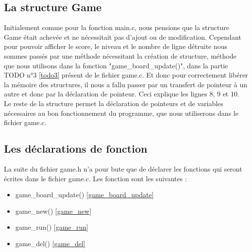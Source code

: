 \documentclass[a4paper,10p]{report}
\begin{document}
\subsection{La structure Game}
Initialement comme pour la fonction main.c, nous pensions que la structure Game était achevée et ne nécessitait pas d'ajout ou de modification. Cependant pour pouvoir afficher le score, le niveau et le nombre de ligne détruite nous sommes passés par une méthode nécessitant la création de structure, méthode que nous utilisons dans la fonction "game\_board\_update()", dans la partie TODO n°3 \ref{todo3} présent de le fichier game.c. Et donc pour correctement libérer la mémoire des structures, il nous a fallu passer par un transfert de pointeur à un autre et donc par la déclaration de pointeur. Ceci explique les lignes \textcolor{gris}{8}, \textcolor{gris}{9} et \textcolor{gris}{10}. Le reste de la structure permet la déclaration de pointeurs et de variables nécessaires au bon fonctionnement du programme, que nous utiliserons dans le fichier game.c.

\subsection{Les déclarations de fonction}
La suite du fichier game.h n'a pour bute que de déclarer les fonctions qui seront écrites dans le fichier game.c. Les fonction sont les suivantes :
\begin{itemize}
\item game\_board\_update() \ref{game_board_update}
\item game\_new() \ref{game_new}
\item game\_run() \ref{game_run}
\item game\_del() \ref{game_del}
\end{itemize}
\end{document}
